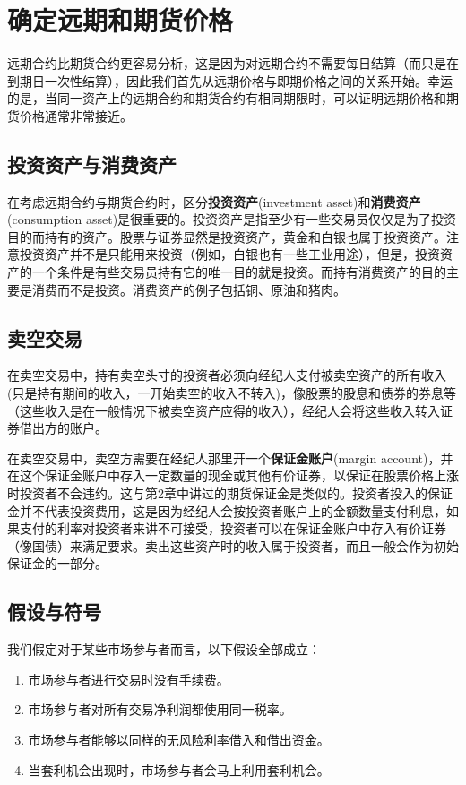 \chapter{确定远期和期货价格}
远期合约比期货合约更容易分析，这是因为对远期合约不需要每日结算（而只是在到期日一次性结算），因此我们首先从远期价格与即期价格之间的关系开始。幸运的是，当同一资产上的远期合约和期货合约有相同期限时，可以证明远期价格和期货价格通常非常接近。
\section{投资资产与消费资产}
在考虑远期合约与期货合约时，区分\textbf{投资资产}(investment asset)和\textbf{消费资产}(consumption asset)是很重要的。投资资产是指至少有一些交易员仅仅是为了投资目的而持有的资产。股票与证券显然是投资资产，黄金和白银也属于投资资产。注意投资资产并不是只能用来投资（例如，白银也有一些工业用途），但是，投资资产的一个条件是有些交易员持有它的唯一目的就是投资。而持有消费资产的目的主要是消费而不是投资。消费资产的例子包括铜、原油和猪肉。
\section{卖空交易}
在卖空交易中，持有卖空头寸的投资者必须向经纪人支付被卖空资产的所有收入(只是持有期间的收入，一开始卖空的收入不转入)，像股票的股息和债券的券息等（这些收入是在一般情况下被卖空资产应得的收入），经纪人会将这些收入转入证券借出方的账户。

在卖空交易中，卖空方需要在经纪人那里开一个\textbf{保证金账户}(margin account)，并在这个保证金账户中存入一定数量的现金或其他有价证券，以保证在股票价格上涨时投资者不会违约。这与第2章中讲过的期货保证金是类似的。投资者投入的保证金并不代表投资费用，这是因为经纪人会按投资者账户上的金额数量支付利息，如果支付的利率对投资者来讲不可接受，投资者可以在保证金账户中存入有价证券（像国债）来满足要求。卖出这些资产时的收入属于投资者，而且一般会作为初始保证金的一部分。
\section{假设与符号}
我们假定对于某些市场参与者而言，以下假设全部成立：
\begin{enumerate}
    \item 市场参与者进行交易时没有手续费。
    \item 市场参与者对所有交易净利润都使用同一税率。
    \item 市场参与者能够以同样的无风险利率借入和借出资金。
    \item 当套利机会出现时，市场参与者会马上利用套利机会。
\end{enumerate}


